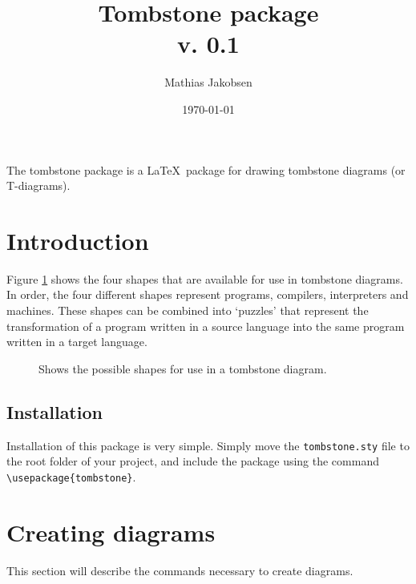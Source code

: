 \documentclass[a4paper]{article}
\title{Tombstone package\\{\normalsize v. 0.1}}
\author{Mathias Jakobsen}
\date{\today}
\begin{document}
    \maketitle

    \noindent The tombstone package is a \LaTeX\, package for drawing tombstone diagrams (or T-diagrams).
    
    \tableofcontents

    \section{Introduction}
    Figure \ref{fig:shapes} shows the four shapes that are available for use in tombstone diagrams. In order, the four different shapes represent programs, compilers, interpreters and machines. These shapes can be combined into `puzzles' that represent the transformation of a program written in a source language into the same program written in a target language.

    \begin{figure}[h]
        \centering
        \caption{Shows the possible shapes for use in a tombstone diagram.}
        \label{fig:shapes}
    \end{figure}

    \subsection{Installation}
    Installation of this package is very simple. Simply move the \lstinline|tombstone.sty| file to the root folder of your project, and include the package using the command \lstinline|\usepackage{tombstone}|.

    \section{Creating diagrams}
    This section will describe the commands necessary to create diagrams.
\end{document}
